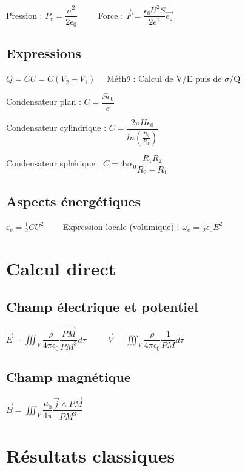 \documentclass[9pt]{article}
\begin{document}
\begin{multicols*}{2}
Pression : $P_{e}=\dfrac{\sigma^{2}}{2\epsilon_{0}}$  $\> \> \> \> \> \> \> \>$ Force : $\overrightarrow{F}=\dfrac{\epsilon_{0}U^{2}S}{2e^{2}}\overrightarrow{e_{z}}$

\subsection{Expressions}

$Q=CU=C(V_{2}-V_{1})$  $\> \> \>$ Méth$\theta$ : Calcul de V/E puis de $\sigma$/Q

Condensateur plan : $C=\dfrac{S\epsilon_{0}}{e}$

Condensateur cylindrique : $C=\dfrac{2\pi H \epsilon_{0}}{ln(\frac{R_{2}}{R_{1}})}$

Condensateur sphérique : $C=4\pi\epsilon_{0}\dfrac{R_{1}R_{2}}{R_{2}-R_{1}}$


\subsection{Aspects énergétiques}

$\varepsilon_{c}=\frac{1}{2}CU^{2}$ $\> \> \> \> \> \> \>$ Expression locale (volumique) : $\omega_{e}=\frac{1}{2}\epsilon_{0}E^{2}$
 

\section{Calcul direct}
\subsection{Champ électrique et potentiel}

$\overrightarrow{E} = \displaystyle\iiint_V \dfrac{\rho}{4\pi\epsilon_{0}}\dfrac{\overrightarrow{PM}}{PM^{3}} d\tau \> \> \> \> \> \> \> \> \> \>$     $\overrightarrow{V} = \displaystyle\iiint_V \dfrac{\rho}{4\pi\epsilon_{0}}\dfrac{1}{PM} d\tau$

\subsection{Champ magnétique}
$\overrightarrow{B} = \displaystyle\iiint_V \dfrac{\mu_{0}}{4\pi}\dfrac{\overrightarrow{j}\wedge\overrightarrow{PM}}{PM^{3}}$   
 
 
\section{Résultats classiques}


\end{multicols*}
\end{document}
